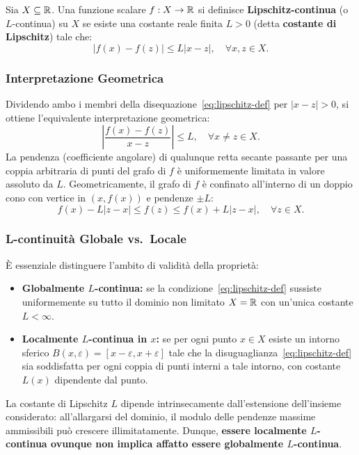 \begin{definition}
\label{def:lipschitz-univariata}
Sia $X \subseteq \mathbb{R}$. Una funzione scalare $f: X \to \mathbb{R}$ si definisce \textbf{Lipschitz-continua} (o $L$-continua) su $X$ se esiste una costante reale finita $L > 0$ (detta \textbf{costante di Lipschitz}) tale che:
\begin{equation}
    |f(x) - f(z)| \le L |x - z|, \quad \forall x, z \in X.
    \label{eq:lipschitz-def}
\end{equation}
\end{definition}

\subsubsection{Interpretazione Geometrica}
Dividendo ambo i membri della disequazione~\eqref{eq:lipschitz-def} per $|x - z| > 0$, si ottiene l'equivalente interpretazione geometrica:
\begin{equation}
    \left| \frac{f(x) - f(z)}{x - z} \right| \le L, \quad \forall x \neq z \in X.
\end{equation}
La pendenza (coefficiente angolare) di qualunque retta secante passante per una coppia arbitraria di punti del grafo di $f$ \`e uniformemente limitata in valore assoluto da $L$. Geometricamente, il grafo di $f$ \`e confinato all'interno di un doppio cono con vertice in $(x, f(x))$ e pendenze $\pm L$:
\begin{equation}
    f(x) - L|z - x| \le f(z) \le f(x) + L|z - x|, \quad \forall z \in X.
\end{equation}

\subsubsection{L-continuit\`a Globale vs.\ Locale}
\`E essenziale distinguere l'ambito di validit\`a della propriet\`a:
\begin{itemize}
    \item \textbf{Globalmente $L$-continua:} se la condizione~\eqref{eq:lipschitz-def} sussiste uniformemente su tutto il dominio non limitato $X = \mathbb{R}$ con un'unica costante $L < \infty$.
    \item \textbf{Localmente $L$-continua in $x$:} se per ogni punto $x \in X$ esiste un intorno sferico $B(x, \varepsilon) = [x - \varepsilon, x + \varepsilon]$ tale che la disuguaglianza~\eqref{eq:lipschitz-def} sia soddisfatta per ogni coppia di punti interni a tale intorno, con costante $L(x)$ dipendente dal punto.
\end{itemize}
La costante di Lipschitz $L$ dipende intrinsecamente dall'estensione dell'insieme considerato: all'allargarsi del dominio, il modulo delle pendenze massime ammissibili pu\`o crescere illimitatamente. Dunque, \textbf{essere localmente $L$-continua ovunque non implica affatto essere globalmente $L$-continua}.

